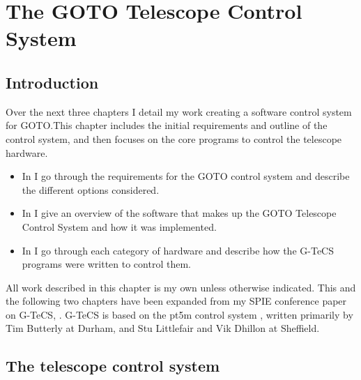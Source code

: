 
\chapter{The GOTO Telescope Control System}
\label{chap:gtecs}


\chaptoc{}


\section{Introduction}
\label{sec:gtecs_intro}


\begin{colsection}

Over the next three chapters I detail my work creating a software control system for GOTO.\@ This chapter includes the initial requirements and outline of the control system, and then focuses on the core programs to control the telescope hardware.
%
\begin{itemize}
    \item In  I go through the requirements for the GOTO control system and describe the different options considered.
    \item In  I give an overview of the software that makes up the GOTO Telescope Control System and how it was implemented.
    \item In  I go through each category of hardware and describe how the G-TeCS programs were written to control them.
\end{itemize}
%
All work described in this chapter is my own unless otherwise indicated. This and the following two chapters have been expanded from my SPIE conference paper on G-TeCS, \citet{Dyer}. G-TeCS is based on the pt5m control system \citep{pt5m}, written primarily by Tim Butterly at Durham, and Stu Littlefair and Vik Dhillon at Sheffield.

\newpage

\end{colsection}


\section{The telescope control system}
\label{sec:control_systems}

